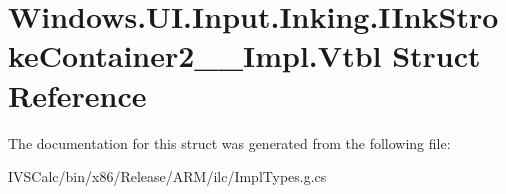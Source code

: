 \hypertarget{struct_windows_1_1_u_i_1_1_input_1_1_inking_1_1_i_ink_stroke_container2_____impl_1_1_vtbl}{}\section{Windows.\+U\+I.\+Input.\+Inking.\+I\+Ink\+Stroke\+Container2\+\_\+\+\_\+\+Impl.\+Vtbl Struct Reference}
\label{struct_windows_1_1_u_i_1_1_input_1_1_inking_1_1_i_ink_stroke_container2_____impl_1_1_vtbl}


The documentation for this struct was generated from the following file\+:\begin{DoxyCompactItemize}
\item 
I\+V\+S\+Calc/bin/x86/\+Release/\+A\+R\+M/ilc/Impl\+Types.\+g.\+cs\end{DoxyCompactItemize}
